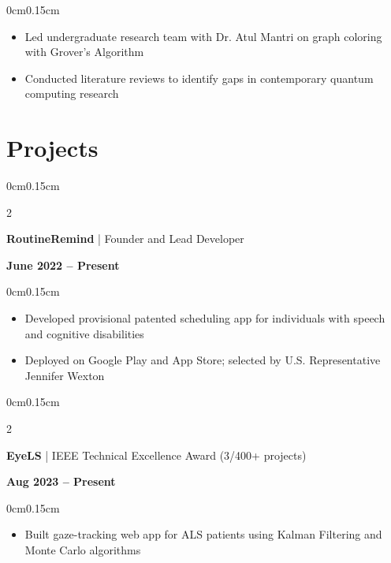 \documentclass[10pt, letterpaper]{article}
\newenvironment{highlights}{
    \begin{itemize}[topsep=0pt, parsep=0pt, partopsep=0pt, itemsep=0pt, leftmargin=0.6cm]
}{
    \end{itemize}
}
\newenvironment{onecolentry}{
    \begin{adjustwidth}{0cm}{0.15cm}
}{
    \end{adjustwidth}
}
\newenvironment{twocolentry}[2][]{
    \onecolentry
    \def\secondColumn{#2}
    \setcolumnwidth{\fill, 4cm}
    \begin{paracol}{2}
}{
    \switchcolumn \raggedleft \secondColumn
    \end{paracol}
    \endonecolentry
}
\begin{document}
    \begin{onecolentry}
        \begin{highlights}
            \item Led undergraduate research team with Dr. Atul Mantri on graph coloring with Grover's Algorithm
            \item Conducted literature reviews to identify gaps in contemporary quantum computing research
        \end{highlights}
    \end{onecolentry}

    \vspace{0.05cm}
    \section{Projects}
    \vspace{0.05cm}

    \begin{twocolentry}{\textbf{June 2022 -- Present}}
        \textbf{RoutineRemind} | Founder and Lead Developer
    \end{twocolentry}

    \begin{onecolentry}
        \begin{highlights}
            \item Developed provisional patented scheduling app for individuals with speech and cognitive disabilities
            \item Deployed on Google Play and App Store; selected by U.S. Representative Jennifer Wexton
        \end{highlights}
    \end{onecolentry}

    \vspace{0.05cm}

    \begin{twocolentry}{\textbf{Aug 2023 -- Present}}
        \textbf{EyeLS} | IEEE Technical Excellence Award (3/400+ projects)
    \end{twocolentry}

    \begin{onecolentry}
        \begin{highlights}
            \item Built gaze-tracking web app for ALS patients using Kalman Filtering and Monte Carlo algorithms
        \end{highlights}
    \end{onecolentry}
\end{document}
